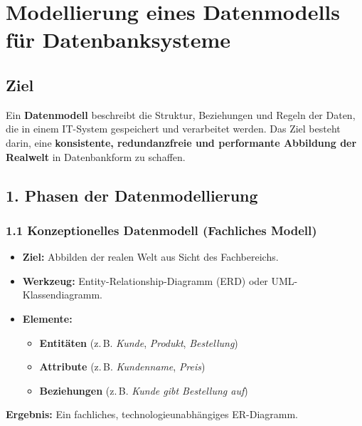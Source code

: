 \section{Modellierung eines Datenmodells für Datenbanksysteme}

\subsection*{Ziel}
Ein \textbf{Datenmodell} beschreibt die Struktur, Beziehungen und Regeln der Daten, 
die in einem IT-System gespeichert und verarbeitet werden. 
Das Ziel besteht darin, eine \textbf{konsistente, redundanzfreie und performante Abbildung der Realwelt} in Datenbankform zu schaffen.

\subsection*{1. Phasen der Datenmodellierung}

\subsubsection*{1.1 Konzeptionelles Datenmodell (Fachliches Modell)}
\begin{itemize}
	\item \textbf{Ziel:} Abbilden der realen Welt aus Sicht des Fachbereichs.
	\item \textbf{Werkzeug:} Entity-Relationship-Diagramm (ERD) oder UML-Klassendiagramm.
	\item \textbf{Elemente:}
	\begin{itemize}
		\item \textbf{Entitäten} (z.\,B. \textit{Kunde}, \textit{Produkt}, \textit{Bestellung})
		\item \textbf{Attribute} (z.\,B. \textit{Kundenname}, \textit{Preis})
		\item \textbf{Beziehungen} (z.\,B. \textit{Kunde gibt Bestellung auf})
	\end{itemize}
\end{itemize}
\textbf{Ergebnis:} Ein fachliches, technologieunabhängiges ER-Diagramm.

